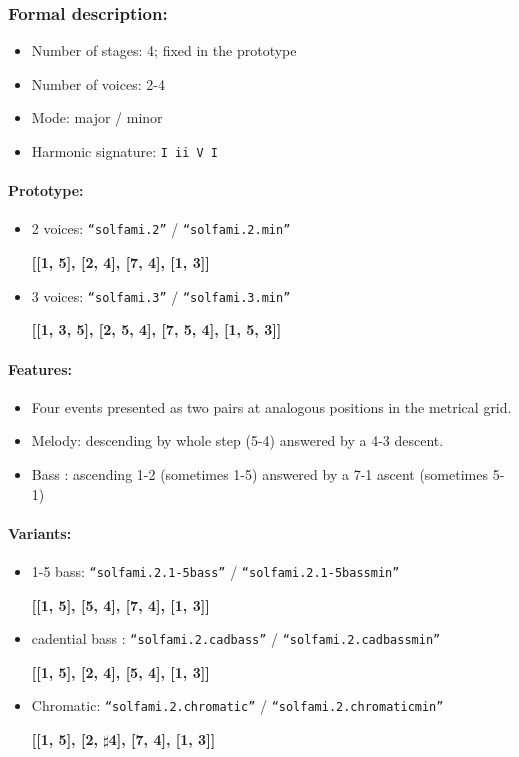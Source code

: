 \documentclass[11pt, openany]{article}
\begin{document}
\subsubsection{Formal description:}
\begin{itemize}
\item Number of stages: 4; fixed in the prototype
\item Number of voices: 2-4
\item Mode: major / minor
\item Harmonic signature: \texttt{I ii V I}
\end{itemize}

\paragraph{Prototype:}
\begin{itemize}
\item 2 voices: \texttt{“solfami.2”} / \texttt{“solfami.2.min”}
	\begin{center}
	\textbf{[[1, 5], [2, 4], [7, 4], [1, 3]]}
	\end{center}
\item 3 voices: \texttt{“solfami.3”} / \texttt{“solfami.3.min”}
	\begin{center}
	\textbf{[[1, 3, 5], [2, 5, 4], [7, 5, 4], [1, 5, 3]]}
	\end{center}
\end{itemize}

\paragraph{Features:}
\begin{itemize}
\item Four events presented as two pairs at analogous positions in the metrical grid.
\item Melody: descending by whole step (5-4) answered by a 4-3 descent.
\item Bass : ascending 1-2 (sometimes 1-5)  answered by a 7-1 ascent (sometimes 5-1) 
\end{itemize}

\paragraph{Variants:}
\begin{itemize}
\item 1-5 bass: \texttt{“solfami.2.1-5bass”} / \texttt{“solfami.2.1-5bassmin”}
	\begin{center}
	\textbf{[[1, 5], [5, 4], [7, 4], [1, 3]]}
	\end{center}
\item cadential bass : \texttt{“solfami.2.cadbass”} / \texttt{“solfami.2.cadbassmin”}
	\begin{center}
	\textbf{[[1, 5], [2, 4], [5, 4], [1, 3]]}
	\end{center}
\item Chromatic: \texttt{“solfami.2.chromatic”} / \texttt{“solfami.2.chromaticmin”}
	\begin{center}
	\textbf{[[1, 5], [2, $\sharp$4], [7, 4], [1, 3]]}
	\end{center}
\end{itemize}
\end{document}
